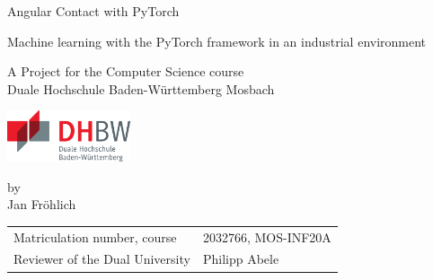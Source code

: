\def\doctype{Studienarbeit T3\_3101}
\def\title{Angular Contact with PyTorch}
\def\subtitle{Machine learning with the PyTorch framework in an industrial environment}
\def\author{Jan Fröhlich}

\begin{titlepage}

	\vspace{10mm}

	\begin{center}
		\vspace*{3mm}

		\huge \title

		\vspace{42.6pt}

		\large \subtitle

		\vspace{42.6pt}

		\small A Project for the Computer Science course \\
		\vspace{7.1pt}
		\large Duale Hochschule Baden-Württemberg Mosbach

		\vspace{14.2pt}

		\includegraphics[height=1.5cm]{assets/logo-dhbw.eps}

		\vspace{42.6pt}

		\small by \\
		\vspace{7.1pt}
		\large \author
	\end{center}

	\vspace{98.6pt}

	\begin{table}[h]
		\centering
		\begin{tabular}{ll}
			\small Matriculation number, course    & 2032766, MOS-INF20A        \\
			\small Reviewer of the Dual University & Philipp Abele              \\
		\end{tabular}
	\end{table}

	\vspace{49.7pt}


\end{titlepage}
